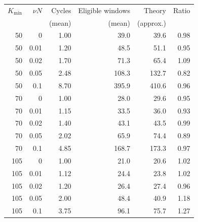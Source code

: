 \begin{tabular}{rrrrrr}
\toprule
$K_{\min}$ & $\nu N$ & Cycles & Eligible windows & Theory & Ratio\\
 & & (mean) & (mean) & (approx.) & \\
\midrule
50 & 0 & 1.00 & 39.0 & 39.6 & 0.98\\
50 & 0.01 & 1.20 & 48.5 & 51.1 & 0.95\\
50 & 0.02 & 1.70 & 71.3 & 65.4 & 1.09\\
50 & 0.05 & 2.48 & 108.3 & 132.7 & 0.82\\
50 & 0.1 & 8.70 & 395.9 & 410.6 & 0.96\\
\midrule
70 & 0 & 1.00 & 28.0 & 29.6 & 0.95\\
70 & 0.01 & 1.15 & 33.5 & 36.0 & 0.93\\
70 & 0.02 & 1.40 & 43.1 & 43.5 & 0.99\\
70 & 0.05 & 2.02 & 65.9 & 74.4 & 0.89\\
70 & 0.1 & 4.85 & 168.7 & 173.3 & 0.97\\
\midrule
105 & 0 & 1.00 & 21.0 & 20.6 & 1.02\\
105 & 0.01 & 1.12 & 24.4 & 23.8 & 1.02\\
105 & 0.02 & 1.20 & 26.4 & 27.4 & 0.96\\
105 & 0.05 & 2.00 & 48.4 & 40.9 & 1.18\\
105 & 0.1 & 3.75 & 96.1 & 75.7 & 1.27\\
\bottomrule
\end{tabular}
